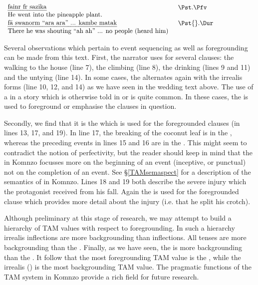 \begin{exe}
	    $\begin{array}{l}
	   	\parbox{9cm}{\emph{fainr fr sazika}} \parbox{0,3cm}{\hfill}\parbox{4cm}{\Pst.\Pfv}\\
	    \parbox{9cm}{He went into the pineapple plant.} \parbox{0,3cm}{\hfill}\parbox{4cm}{\hfill}\\
	    \end{array}$
	    $\begin{array}{l}
	   	\parbox{9cm}{\emph{fä swanorm ``ara ara'' ... kambe matak}} \parbox{0,3cm}{\hfill}\parbox{4cm}{\Pst{}.\Dur}\\
	    \parbox{9cm}{There he was shouting ``ah ah'' ... no people (heard him)} \parbox{0,3cm}{\hfill}\parbox{4cm}{\hfill}\\
	    \end{array}$
	\\
	\label{masentext}
\end{exe}

Several observations which pertain to event sequencing as well as foregrounding can be made from this text. First, the narrator uses   for several clauses: the walking to the house (line 7), the climbing (line 8), the drinking (lines 9 and 11) and the untying (line 14). In some cases, the  alternates again with the irrealis  forms (line 10, 12, and 14) as we have seen in the wedding text above. The use of a   in a story which is otherwise told in  or  is quite common. In these cases, the  is used to foreground or emphasise the clauses in question.%

Secondly, we find that it is the   which is used for the foregrounded clauses (in lines 13, 17, and 19). In line 17, the breaking of the coconut leaf is in the , whereas the preceding events in lines 15 and 16 are in the . This might seem to contradict the notion of perfectivity, but the reader should keep in mind that the  in Komnzo focusses more on the beginning of an event (inceptive, or punctual) not on the completion of an event. See \S{}\ref{TAMsemaspect} for a description of the semantics of  in Komnzo. Lines 18 and 19 both describe the severe injury which the protagonist received from his fall. Again the   is used for the foregrounded clause which provides more detail about the injury (i.e. that he split his crotch).%

Although preliminary at this stage of research, we may attempt to build a hierarchy of TAM values with respect to foregrounding. In such a hierarchy irrealis inflections are more backgrounding than  inflections. All  tenses are more backgrounding than the . Finally, as we have seen, the  is more backgrounding than the . It follow that the most foregrounding TAM value is the , while the irrealis () is the most backgrounding TAM value. The pragmatic functions of the TAM system in Komnzo provide a rich field for future research.